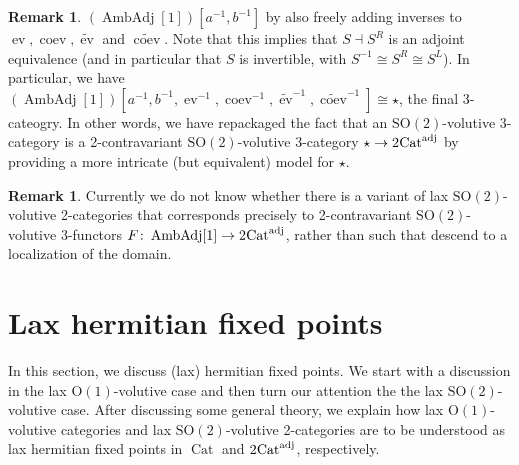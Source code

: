 \documentclass{article}
\newcommand{\ev}{\operatorname{ev}}%
\newcommand{\coev}{\operatorname{coev}}%
\newcommand{\Cat}{\operatorname{Cat}}%
\newcommand{\AmAdj}{\operatorname{AmbAdj}}%
\newcommand{\Oone}{\operatorname{O(1)}}
\newcommand{\Sotwo}{\operatorname{SO(2)}}
\numberwithin{equation}{section}
\theoremstyle{definition}
\newtheorem{remark}[definition]{Remark}
\theoremstyle{theorem}
\begin{document}
\begin{remark}
    $(\AmAdj[1])[a^{-1},b^{-1}]$ by also freely adding inverses to $\ev,\coev,\widetilde{\ev}$ and $\widetilde{\coev}$. Note that this  
    implies that $S \dashv S^R$ is an adjoint equivalence (and in particular that $S$ is invertible, with $S^{-1} \cong S^R \cong S^L$). 
    In particular, we have $(\AmAdj[1])[a^{-1},b^{-1},\ev^{-1},\coev^{-1},\widetilde{\ev}^{-1},\widetilde{\coev}^{-1}] \cong \star$, the final 3-cateogry. 
    In other words, we have repackaged the fact that an $\Sotwo$-volutive 3-category is a 2-contravariant $\Sotwo$-volutive 3-category 
    $\star \to 2\hspace{-0.05cm}\Cat^{\operatorname{adj}}$ by providing a more intricate (but equivalent) model for $\star$. 
\end{remark}
\begin{remark}
    Currently we do not know whether there is a variant of lax $\Sotwo$-volutive 2-categories that corresponds precisely to 
    2-contravariant $\Sotwo$-volutive 3-functors $F \colon \AmAdj[1] \to 2\hspace{-0.05cm}\Cat^{\operatorname{adj}}$, rather than such that descend 
    to a localization of the domain. 
\end{remark}

\section{Lax hermitian fixed points}\label{Section: Lax hermitian fixed points}
In this section, we discuss (lax) hermitian fixed points. We start with a discussion in the lax $\Oone$-volutive case and then turn our attention the 
the lax $\Sotwo$-volutive case. After discussing some general theory, we explain how lax $\Oone$-volutive categories and lax $\Sotwo$-volutive 2-categories 
are to be understood as lax hermitian fixed points in $\Cat$ and $2\hspace{-0.05cm}\Cat^{\operatorname{adj}}$, respectively.
\end{document}

